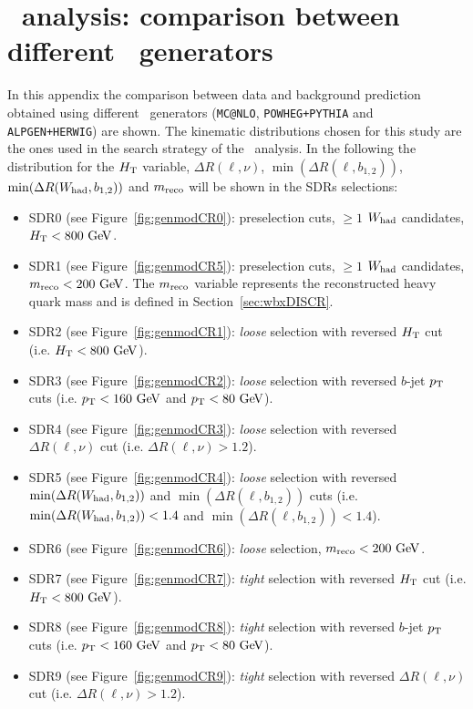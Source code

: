 \clearpage{\pagestyle{empty}\cleardoublepage}

\chapter{\wbx\ analysis: comparison between different \ttbar\ generators}\label{app:wbxGENMOD}

In this appendix the comparison between data
and background prediction obtained using different \ttbar\ generators
(\texttt{MC@NLO}, \texttt{POWHEG+PYTHIA} 
and \texttt{ALPGEN+HERWIG})
are shown. The kinematic distributions chosen
for this study are the ones used in the search strategy
of the \wbx\ analysis. In the following the distribution for
the $\HT$ variable, $\Delta R(\ell,\nu)$, $\min(\Delta R(\ell, b_{1,2}))$, 
$\min(\Delta R(W_{\rm had}, b_{1,2}))$ and $m_{\rm reco}$ will be
shown in the SDRs selections:

\begin{itemize}
\item SDR0 (see Figure~\ref{fig:genmodCR0}): preselection cuts, $\geq 1$ $W_{\rm had}$ candidates, $\HT<800\gev$. 
\item SDR1 (see Figure~\ref{fig:genmodCR5}): preselection cuts, $\geq 1$ $W_{\rm had}$ candidates, $m_{\rm reco}<200\gev$. The $m_{\rm reco}$ variable represents the
reconstructed heavy quark mass and is defined in Section~\ref{sec:wbxDISCR}. 
\item SDR2 (see Figure~\ref{fig:genmodCR1}): {\sl loose} selection with reversed $\HT$ cut (i.e. $\HT<800\gev$).
\item SDR3 (see Figure~\ref{fig:genmodCR2}): {\sl loose} selection with reversed $b$-jet $\pt$ cuts (i.e. $\pt < 160\gev$ and $\pt < 80\gev$).
\item SDR4 (see Figure~\ref{fig:genmodCR3}): {\sl loose} selection with reversed $\Delta R(\ell,\nu)$ cut (i.e. $\Delta R(\ell,\nu)>1.2$).
\item SDR5 (see Figure~\ref{fig:genmodCR4}): {\sl loose} selection with reversed $\min(\Delta R(W_{\rm had}, b_{1,2}))$ and $\min(\Delta R(\ell, b_{1,2}))$ cuts 
(i.e. $\min(\Delta R(W_{\rm had}, b_{1,2}))<1.4$ and $\min(\Delta R(\ell, b_{1,2}))<1.4$).
\item SDR6 (see Figure~\ref{fig:genmodCR6}): {\sl loose} selection, $m_{\rm reco}<200\gev$. 
\item SDR7 (see Figure~\ref{fig:genmodCR7}): {\sl tight} selection with reversed $\HT$ cut (i.e. $\HT<800\gev$).
\item SDR8 (see Figure~\ref{fig:genmodCR8}): {\sl tight} selection with reversed $b$-jet $\pt$ cuts (i.e. $\pt < 160\gev$ and $\pt < 80\gev$).
\item SDR9 (see Figure~\ref{fig:genmodCR9}): {\sl tight} selection with reversed $\Delta R(\ell,\nu)$ cut (i.e. $\Delta R(\ell,\nu)>1.2$).
\end{itemize}

